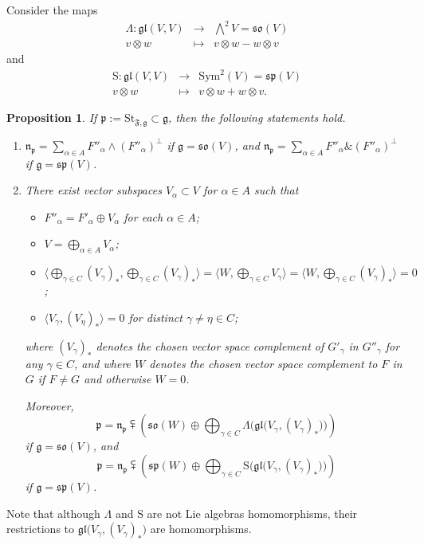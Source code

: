 \documentclass{article}
\newcommand {\St} {\mathrm{St}}
\def\gl{\mathfrak {gl}}
\def\g{\mathfrak {g}}
\def\n{\mathfrak {n}}
\def\p{\mathfrak {p}}
\def\so{\mathfrak{so}}
\def\sp{\mathfrak{sp}}
\def\F{\mathfrak{F}}
\newcommand{\Sym}{\mathrm{Sym}}
\newtheorem{prop}[thm]{Proposition}
\begin{document}
Consider the maps
\begin{eqnarray*}
\Lambda \colon \gl(V,V) & \rightarrow & {\bigwedge}^2 V = \so(V) \\
v \otimes w & \mapsto & v \otimes w - w \otimes v
\end{eqnarray*}
and
\begin{eqnarray*}
\mathrm{S} \colon \gl(V,V) & \rightarrow & \Sym^2 (V) = \sp(V) \\
v \otimes w & \mapsto & v \otimes w + w \otimes v.
\end{eqnarray*}


\begin{prop}
If $\p := \St_{\F,\g} \subset \g$, then the following statements hold.
\begin{enumerate}
\item $\n_\p = \sum_{\alpha \in A} F''_\alpha \wedge (F''_\alpha)^\perp$ if $\g = \so(V)$,
and $\n_\p = \sum_{\alpha \in A} F''_\alpha \& (F''_\alpha)^\perp$ if $\g = \sp(V)$.
\item  There exist vector subspaces $V_\alpha \subset V$ for $\alpha \in A$  such that
\begin{itemize}
\item $F''_\alpha = F'_\alpha \oplus V_\alpha$ for each $\alpha \in A$;
\item $V = \bigoplus_{\alpha \in A} V_\alpha$;
\item $\langle  \bigoplus_{\gamma \in C} (V_\gamma)_* , \bigoplus_{\gamma \in C} (V_\gamma)_* \rangle = 
\langle W , \bigoplus_{\gamma \in C} V_\gamma \rangle = \langle W , \bigoplus_{\gamma \in C} (V_\gamma)_* \rangle = 0$;
\item $\langle V_\gamma , (V_\eta)_* \rangle = 0$ for distinct $\gamma \neq \eta \in C$;
\end{itemize}
where $(V_\gamma)_*$ denotes the chosen vector space complement of $G'_\gamma$ in $G''_\gamma$ for any $\gamma \in C$, and where $W$ denotes the chosen vector space complement to $F$ in $G$ if $F \neq G$ and otherwise $W = 0$.

Moreover,
$$\p = \n_\p \subsetplus \left( \so(W) \oplus \bigoplus_{\gamma \in C} \Lambda \big( \gl \big( V_\gamma, (V_\gamma)_* \big) \big) \right)$$ if $\g = \so(V)$,
and
$$\p = \n_\p \subsetplus \left(\sp(W) \oplus \bigoplus_{\gamma \in C} \mathrm{S} \big( \gl \big( V_\gamma, (V_\gamma)_* \big) \big) \right)$$ if $\g = \sp(V)$.
\end{enumerate}
\end{prop}


Note that although $\Lambda$ and $\mathrm{S}$ are not Lie algebras homomorphisms, their restrictions to $\gl \big( V_\gamma, (V_\gamma)_* \big)$ are homomorphisms.
\end{document}
